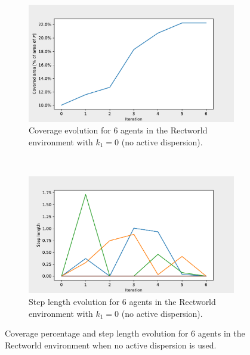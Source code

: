 \begin{figure}[H]
  \centering
  \begin{subfigure}[t]{0.5\textwidth}
    \centering
    \includegraphics[width=\textwidth]{figs/bigworld_6_agnt_k_1_0_k_2_1_area_traj.pdf}
    \caption{Coverage evolution for 6 agents in the Rectworld environment with $k_{1} = 0$ (no active dispersion).}
    \label{fig:6_agnt_bw_k_1_0_a_traj}
  \end{subfigure}%
  ~ 
  \begin{subfigure}[t]{0.5\textwidth}
    \centering
    \includegraphics[width=\textwidth]{figs/bigworld_6_agnt_k_1_0_k_2_1_step_traj.pdf}
    \caption{Step length evolution for 6 agents in the Rectworld environment with $k_{1} = 0$ (no active dispersion).}
    \label{fig:6_agnt_bw_k_1_0_s_traj}
  \end{subfigure}
  \caption{Coverage percentage and step length evolution for 6 agents in the Rectworld environment when no active dispersion is used.}
  \label{fig:6_agnt_bw_evolution}
\end{figure}


